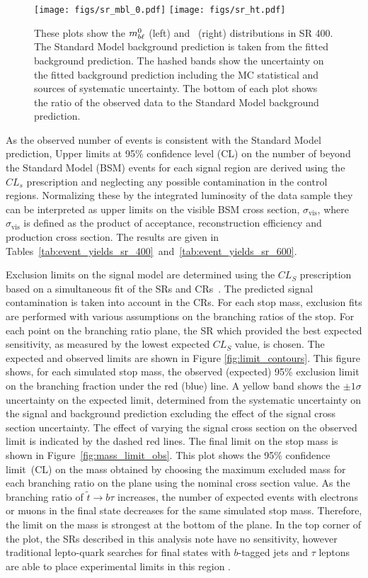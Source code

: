 \begin{figure}[ht]
  \centering
  \texttt{[image: figs/sr\_mbl\_0.pdf]}
  \texttt{[image: figs/sr\_ht.pdf]}
  \caption{These plots show the $m_{b\ell}^0$ (left) and \HT\ (right) distributions
    in SR 400. The Standard Model background prediction is taken from the
    fitted background prediction. The hashed bands show
    the uncertainty on the fitted background prediction including the MC
    statistical and sources of systematic uncertainty.  The bottom of
    each plot shows the ratio of the observed data to the Standard Model
    background prediction.
  }
  \label{fig:sr_dists}
\end{figure}

As the observed number of events is consistent with the Standard Model
prediction, Upper limits at 95\% confidence level (CL) on the number of
beyond the Standard Model (BSM) events for each signal region are derived
using the $CL_s$ prescription and neglecting any possible contamination in the
control regions. Normalizing these by the integrated luminosity of the data
sample they can be interpreted as upper limits on the visible BSM
cross section, $\sigma_\mathrm{vis}$, where $\sigma_\mathrm{vis}$ is defined
as the product of acceptance, reconstruction efficiency and production
cross section. The results are given in
Tables~\ref{tab:event_yields_sr_400}~and~\ref{tab:event_yields_sr_600}.

Exclusion limits on the signal model are determined using the $CL_S$
prescription based on a simultaneous fit of the SRs and
CRs~\cite{Baak:2014wma}. The predicted signal contamination is
taken into account in the CRs.  For each stop mass,
exclusion fits are performed with various assumptions on the branching
ratios of the stop. For each point on the branching ratio plane, the
SR which provided the best expected sensitivity, as
measured by the lowest expected $CL_S$ value, is chosen. The expected
and observed limits are shown in Figure \ref{fig:limit_contours}. This figure
shows, for each simulated stop mass, the observed (expected) 95\% exclusion
limit on the 
branching fraction under the red (blue) line. A yellow band shows the
$\pm 1\sigma$ uncertainty on the expected limit, determined from the
systematic uncertainty on the signal and background prediction excluding
the effect of the signal cross section uncertainty.  The effect of varying
the signal cross section on the observed limit is indicated by the dashed
red lines.  The final limit on the stop mass is shown in
Figure~\ref{fig:mass_limit_obs}.  This plot shows the 95\% confidence
limit~(CL)
on the mass obtained by choosing the maximum excluded mass for each
branching ratio on the plane using the nominal cross section value.  
As the branching ratio of $\tilde{t} \rightarrow b\tau$ increases, the number
of expected events with electrons or muons in the final state decreases
for the same simulated stop mass. Therefore, the limit on the mass is
strongest at the bottom of the plane. In the top corner of the plot, the
SRs described in this analysis note have no sensitivity, however traditional
lepto-quark searches for final states with $b$-tagged jets and $\tau$ leptons
are able to place experimental limits in this region \cite{ATLAS:2013oea}.

